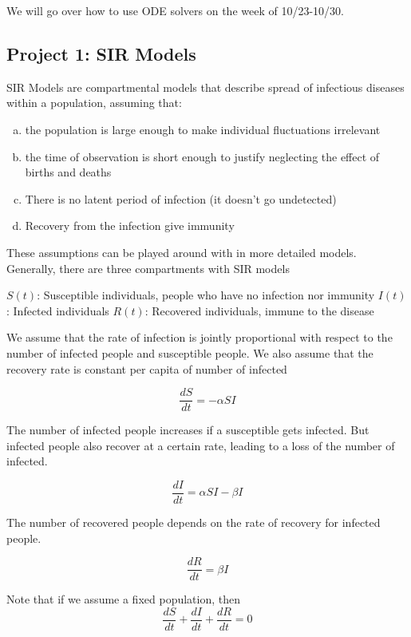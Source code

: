 \documentclass[12pt]{article}
\begin{document}
We will go over how to use ODE solvers on the week of 10/23-10/30. 

\subsection{Project 1: SIR Models}

SIR Models are compartmental models that describe spread of infectious diseases within a population, assuming that:

\begin{enumerate}[a)]
	\item the population is large enough to make individual fluctuations irrelevant
	\item the time of observation is short enough to justify neglecting the effect of births and deaths
	\item There is no latent period of infection (it doesn't go undetected)
	\item Recovery from the infection give immunity
\end{enumerate}

These assumptions can be played around with in more detailed models. Generally, there are three compartments with SIR models

$S(t)$: Susceptible individuals, people who have no infection nor immunity
$I(t)$: Infected individuals
$R(t)$: Recovered individuals, immune to the disease

We assume that the rate of infection is jointly proportional with respect to the number of infected people and susceptible people. We also assume that the recovery rate is constant per capita of number of infected

$$\frac{dS}{dt}=-\alpha S I$$

The number of infected people increases if a susceptible gets infected. But infected people also recover at a certain rate, leading to a loss of the number of infected.

$$\frac{dI}{dt}=\alpha S I -\beta I$$

The number of recovered people depends on the rate of recovery for infected people.

$$\frac{dR}{dt}=\beta I$$

Note that if we assume a fixed population, then
$$\frac{dS}{dt}+\frac{dI}{dt}+\frac{dR}{dt}=0$$
\end{document}
